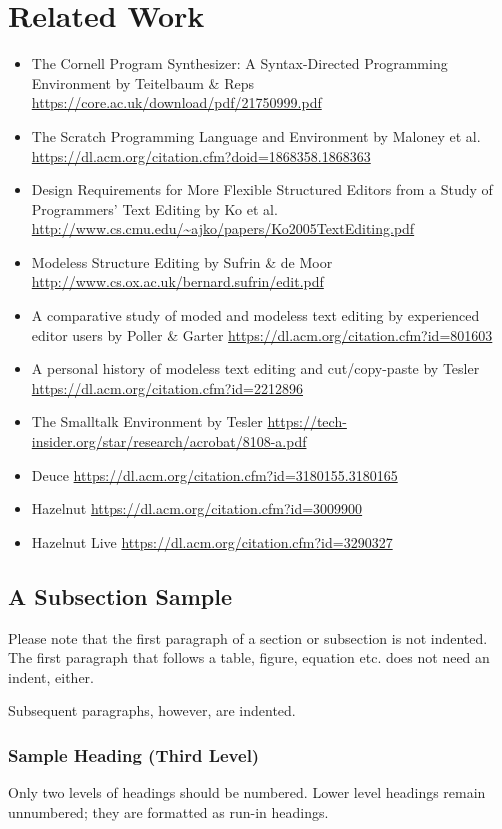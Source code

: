 \documentclass[runningheads]{llncs}
\begin{document}
\section{Related Work}
\begin{itemize}
\item The Cornell Program Synthesizer: A Syntax-Directed Programming Environment by Teitelbaum \& Reps \url{https://core.ac.uk/download/pdf/21750999.pdf}
\item The Scratch Programming Language and Environment by Maloney et al. \url{https://dl.acm.org/citation.cfm?doid=1868358.1868363}
\item Design Requirements for More Flexible Structured Editors from a Study of Programmers' Text Editing by Ko et al. \url{http://www.cs.cmu.edu/~ajko/papers/Ko2005TextEditing.pdf}
\item Modeless Structure Editing by Sufrin \& de Moor \url{http://www.cs.ox.ac.uk/bernard.sufrin/edit.pdf}
\item A comparative study of moded and modeless text editing by experienced editor users by Poller \& Garter \url{https://dl.acm.org/citation.cfm?id=801603}
\item A personal history of modeless text editing and cut/copy-paste by Tesler \url{https://dl.acm.org/citation.cfm?id=2212896}
\item The Smalltalk Environment by Tesler \url{https://tech-insider.org/star/research/acrobat/8108-a.pdf}

\item Deuce \url{https://dl.acm.org/citation.cfm?id=3180155.3180165}
\item Hazelnut \url{https://dl.acm.org/citation.cfm?id=3009900}
\item Hazelnut Live \url{https://dl.acm.org/citation.cfm?id=3290327}
\end{itemize}

\newpage
\subsection{A Subsection Sample}
Please note that the first paragraph of a section or subsection is
not indented. The first paragraph that follows a table, figure,
equation etc. does not need an indent, either.

Subsequent paragraphs, however, are indented.

\subsubsection{Sample Heading (Third Level)} Only two levels of
headings should be numbered. Lower level headings remain unnumbered;
they are formatted as run-in headings.
\end{document}
